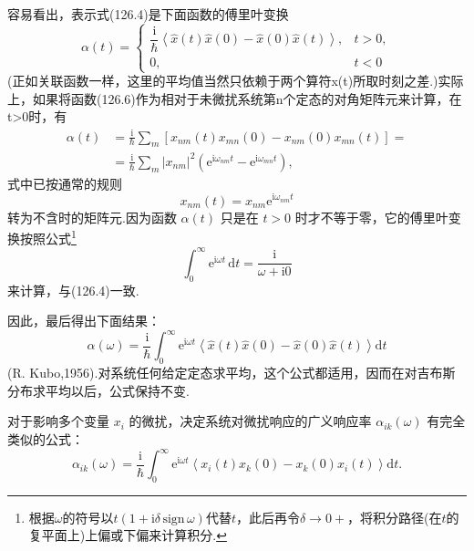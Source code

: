 容易看出，表示式(126.4)是下面函数的傅里叶变换
\begin{equation}
  \alpha(t)=\left\{
  \begin{array}{ll}
    \dfrac{\mathrm{i}}{\hbar}\left\langle\hat{x}(t)\hat{x}(0)
    -\hat{x}(0)\hat{x}(t)\right\rangle, & t>0,\\[1em]
    0, & t<0
  \end{array}\right.
\end{equation}
(正如关联函数一样，这里的平均值当然只依赖于两个算符x(t)所取时刻之差.)实际上，如果将函数(126.6)作为相对于未微扰系统第n个定态的对角矩阵元来计算，在t>0时，有
\begin{equation*}
\begin{aligned}
  \alpha(t)&=\frac{\mathrm{i}}{\hbar}\sum_m
  \left[x_{nm}(t)x_{mn}(0)-x_{nm}(0)x_{mn}(t)\right]=\\
  &=\frac{\mathrm{i}}{\hbar}\sum_m|x_{nm}|^2
  \left(\mathrm{e}^{\mathrm{i}\omega_{nm}t}-\mathrm{e}^{\mathrm{i}\omega_{mn}t}\right),
\end{aligned}
\end{equation*}
式中已按通常的规则
\begin{equation*}
  x_{nm}(t)=x_{nm}\mathrm{e}^{\mathrm{i}\omega_{nm}t}
\end{equation*}
转为不含时的矩阵元.因为函数 $\alpha(t)$ 只是在 $t>0$ 时才不等于零，它的傅里叶变换按照公式\footnote{根据$\omega$的符号以$t(1+\mathrm{i}\delta\,\mathrm{sign}\,\omega)$代替$t$，此后再令$\delta\to0+$，将积分路径(在$t$的复平面上)上偏或下偏来计算积分.}
\begin{equation}
  \int_0^{\infty}\mathrm{e}^{\mathrm{i}\omega t}\,\mathrm{d}t
  =\frac{\mathrm{i}}{\omega+\mathrm{i}0}
\end{equation}
来计算，与(126.4)一致.

因此，最后得出下面结果：
\begin{equation}
  \alpha(\omega)=\frac{\mathrm{i}}{\hbar}\int_0^{\infty}\mathrm{e}^{\mathrm{i}\omega t}
  \left\langle\hat{x}(t)\hat{x}(0)-\hat{x}(0)\hat{x}(t)\right\rangle\mathrm{d}t
\end{equation}
(R. Kubo,1956).对系统任何给定定态求平均，这个公式都适用，因而在对吉布斯分布求平均以后，公式保持不变.

对于影响多个变量 $x_i$ 的微扰，决定系统对微扰响应的广义响应率 $\alpha_{ik}(\omega)$ 有完全类似的公式：
\begin{equation}
  \alpha_{ik}(\omega)=\frac{\mathrm{i}}{\hbar}\int_0^{\infty}
  \mathrm{e}^{\mathrm{i}\omega t}
  \left\langle x_i(t)x_k(0)-x_k(0)x_i(t)\right\rangle\mathrm{d}t.
\end{equation}

